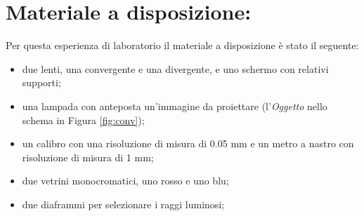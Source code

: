 \section{Materiale a disposizione:}

Per questa esperienza di laboratorio il materiale a disposizione è stato il seguente:
\begin{itemize}
	\item{due lenti, una convergente e una divergente, e uno schermo con relativi supporti;}
    \item{una lampada con anteposta un'immagine da proiettare (l'\emph{Oggetto} nello schema in Figura \ref{fig:conv});}
	\item{un calibro con una risoluzione di misura di 0.05 mm e un metro a nastro con risoluzione di misura di 1 mm;}
	\item{due vetrini monocromatici, uno rosso e uno blu;}
	\item{due diaframmi per selezionare i raggi luminosi;}
\end{itemize}
